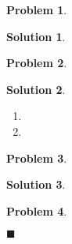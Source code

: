 \documentclass[10pt]{article}
\author{}
\title{}
\date{\today}
\theoremstyle{plain}
\theoremstyle{definition}
\newtheorem*{prob}{Problem}
\newtheorem*{sol}{Solution}
\theoremstyle{remark}
\begin{document}
\begin{prob}

\end{prob}

\medskip

\begin{sol}

\end{sol}

\pagebreak

\begin{prob}

\end{prob}

\medskip

\begin{sol}

\end{sol}

\medskip

\begin{enumerate}[label=(\roman*)]
    \item 
    \item 
\end{enumerate}

\pagebreak

\begin{prob}

\end{prob}

\medskip

\begin{sol}

\end{sol}

\medskip

\begin{description}
    \item 
    \item 
\end{description}

\pagebreak

\begin{prob}

\end{prob}

\medskip

\begin{pf}


\newline
$\blacksquare$ \\
\end{pf}
\end{document}
